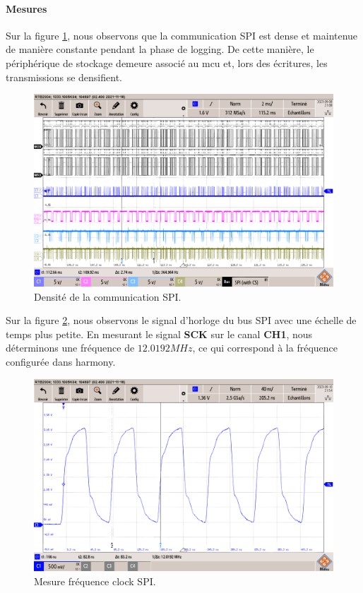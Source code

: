 \clearpage

\paragraph{Mesures} Sur la figure \ref{fig:densite-comm}, nous observons que la communication SPI est dense et maintenue de manière constante pendant la phase de logging. De cette manière, le périphérique de stockage demeure associé au \gls{mcu} et, lors des écritures, les transmissions se densifient.

\begin{figure}[H]
	\centering
	\includegraphics[width=0.7\linewidth]{../figures/mesures/SPI/densite-comm}
	\caption{Densité de la communication SPI.}
	\label{fig:densite-comm}
\end{figure}

Sur la figure \ref{fig:freq-spi}, nous observons le signal d'horloge du bus SPI avec une échelle de temps plus petite. En mesurant le signal \textbf{SCK} sur le canal \textbf{CH1}, nous déterminons une fréquence de \underline{$12.0192MHz$}, ce qui correspond à la fréquence configurée dans \gls{harmony}.

\begin{figure}[H]
	\centering
	\includegraphics[width=0.7\linewidth]{../figures/mesures/SPI/freq-spi-12}
	\caption{Mesure fréquence clock SPI.}
	\label{fig:freq-spi}
\end{figure}

